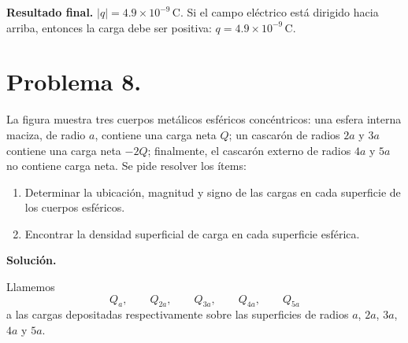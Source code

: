 \documentclass[11pt]{article}
\newcommand{\soluciontitulo}{%
  \par\medskip
  \noindent\textbf{Solución.}\par
  \smallskip
}
\newcommand{\resultadofinal}[1]{%
  \par\medskip
  \noindent\textbf{Resultado final.} #1\par
}
\begin{document}
\resultadofinal{$\boxed{|q|=4.9\times10^{-9}\,\mathrm{C}.}$ Si el campo eléctrico está dirigido hacia arriba, entonces la carga debe ser positiva: $\boxed{q=4.9\times10^{-9}\,\mathrm{C}.}$}

\clearpage


\section*{Problema 8.}
La figura muestra tres cuerpos metálicos esféricos concéntricos: una esfera interna maciza, de radio $a$, contiene una carga neta $Q$; un cascarón de radios $2a$ y $3a$ contiene una carga neta $-2Q$; finalmente, el cascarón externo de radios $4a$ y $5a$ no contiene carga neta. Se pide resolver los ítems:
\begin{enumerate}[label=(\alph*)]
    \item Determinar la ubicación, magnitud y signo de las cargas en cada superficie de los cuerpos esféricos.
    \item Encontrar la densidad superficial de carga en cada superficie esférica.
\end{enumerate}

\soluciontitulo

Llamemos
\begin{equation*}
Q_a,\qquad Q_{2a},\qquad Q_{3a},\qquad Q_{4a},\qquad Q_{5a}
\end{equation*}
a las cargas depositadas respectivamente sobre las superficies de radios $a$, $2a$, $3a$, $4a$ y $5a$.
\end{document}
